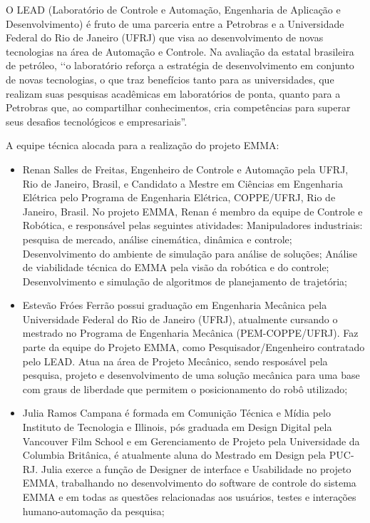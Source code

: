 O LEAD (Laboratório de Controle e Automação, Engenharia de Aplicação e
Desenvolvimento) é fruto de uma parceria entre a Petrobras e a Universidade
Federal do Rio de Janeiro (UFRJ) que visa ao desenvolvimento de novas
tecnologias na área de Automação e Controle.
Na avaliação da estatal brasileira de petróleo, ‘‘o laboratório reforça a
estratégia de desenvolvimento em conjunto de novas tecnologias, o que traz
benefícios tanto para as universidades, que realizam suas pesquisas acadêmicas
em laboratórios de ponta, quanto para a Petrobras que, ao compartilhar
conhecimentos, cria competências para superar seus desafios tecnológicos e
empresariais”.


A equipe técnica alocada para a realização do projeto EMMA:

\begin{itemize}
  \item Renan Salles de Freitas, Engenheiro de Controle e
Automação pela UFRJ, Rio de Janeiro, Brasil, e Candidato a Mestre em Ciências em Engenharia Elétrica
pelo Programa de Engenharia Elétrica, COPPE/UFRJ, Rio de Janeiro, Brasil. No
projeto EMMA, Renan é membro da equipe de Controle e Robótica, e responsável
pelas seguintes atividades: Manipuladores industriais: pesquisa de
mercado, análise cinemática, dinâmica e controle; Desenvolvimento do ambiente de
simulação para análise de soluções; Análise de viabilidade técnica do EMMA pela
visão da robótica e do controle; Desenvolvimento e simulação de algoritmos de
planejamento de trajetória;

  \item Estevão Fróes Ferrão possui graduação em Engenharia Mecânica pela Universidade
Federal do Rio de Janeiro (UFRJ), atualmente cursando o mestrado no Programa de Engenharia
Mecânica (PEM-COPPE/UFRJ). Faz parte da equipe do Projeto EMMA, como
Pesquisador/Engenheiro contratado pelo LEAD. Atua na área de Projeto Mecânico,
sendo resposável pela pesquisa, projeto e desenvolvimento de uma solução
mecânica para uma base com graus de liberdade que permitem o posicionamento do
robô utilizado;

\item Julia Ramos Campana é formada em Comunição Técnica e Mídia pelo Instituto de
Tecnologia e Illinois, pós graduada em Design Digital pela Vancouver Film School
e em Gerenciamento de Projeto pela Universidade da Columbia Britânica, é
atualmente aluna do Mestrado em Design pela PUC-RJ. Julia exerce a função de
Designer de interface e Usabilidade no projeto EMMA, trabalhando no
desenvolvimento do software de controle do sistema EMMA e em todas as questões
relacionadas aos usuários, testes e interações humano-automação da pesquisa;


\end{itemize}
